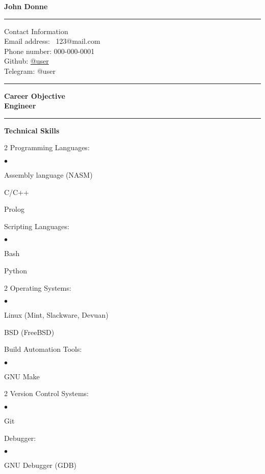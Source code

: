 \documentclass[oneside,final,12pt]{extreport}
\newenvironment{compactlist}{
	\begin{list}{{$\bullet$}}{
		\setlength\leftmargin{0.4cm}
		\setlength\partopsep{0pt}
		\setlength\parskip{0pt}
		\setlength\parsep{0pt}
		\setlength\topsep{0pt}
		\setlength\itemsep{0pt}
	}
}{
	\end{list}
}
\begin{document}
\bfseries
John Donne\\
\rule{\textwidth}{0.4pt}
Contact Information \\
\noindent
\mdseries
Email address: \
123@mail.com \\
Phone number:
000-000-0001 \\
Github: 
\href{https://github.com/user}{@user} \\
Telegram:
@user \\
\rule{\textwidth}{0.4pt}

\bfseries
Career Objective \\
\mdseries
Engineer \\
\rule{\textwidth}{0.4pt}

\bfseries
Technical Skills
\mdseries
\begin{multicols}{2}
Programming Languages:
	\begin{compactlist}
		\item Assembly language (NASM)
		\item C/C++
		\item Prolog
	\end{compactlist}
		Scripting Languages:
	\begin{compactlist}
		\item Bash
		\item Python
	\end{compactlist}
\end{multicols}

\begin{multicols}{2}
Operating Systems:
	\begin{compactlist}
		\item Linux (Mint, Slackware, Devuan)
		\item *BSD (FreeBSD)
	\end{compactlist}
Build Automation Tools:
	\begin{compactlist}
		\item GNU Make
	\end{compactlist}
\end{multicols}

\begin{multicols}{2}
Version Control Systems:
	\begin{compactlist}
		\item Git
	\end{compactlist}
	Debugger:
	\begin{compactlist}
		 \item GNU Debugger (GDB)
	\end{compactlist}
\end{multicols}
\end{document}

